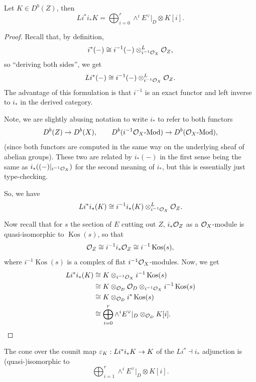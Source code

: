 \documentclass[12pt]{article}
\DeclareMathOperator{\Kos}{Kos}
\begin{document}
\begin{prop}\label{push-pull}
    Let $K\in D^b(Z)$, then
    \[Li^* i_* K = \bigoplus_{i=0}^r \wedge^i E^\vee|_D \otimes K [i].\]
\end{prop}
\begin{proof}
    Recall that, by definition,
    \[i^*(-) \cong i^{-1}(-) \otimes^L_{i^{-1}\mathcal{O}_X} \mathcal{O}_Z,\]
    so ``deriving both sides'', we get
    \[Li^*(-) \cong i^{-1}(-) \otimes^L_{i^{-1}\mathcal{O}_X} \mathcal{O}_Z.\]
    The advantage of this formulation is that $i^{-1}$ is an exact functor and left inverse to $i_*$ in the derived category.
    
    Note, we are slightly abusing notation to write $i_*$ to refer to both functors
    \[D^b(Z)\to D^b(X), \qquad D^b(i^{-1}\mathcal{O}_X\text{-}\mathrm{Mod}) \to D^b(\mathcal{O}_X\text{-}\mathrm{Mod}),\]
    (since both functors are computed in the same way on the underlying sheaf of abelian groups). These two are related by $i_*(-)$ in the first sense being the same as $i_*((-)|_{i^{-1}\mathcal{O}_X})$ for the second meaning of $i_*$, but this is essentially just type-checking.

    So, we have
    \[Li^*i_*(K) \cong i^{-1}i_*(K) \otimes_{i^{-1}\mathcal{O}_X}^L \mathcal{O}_Z.\]

    Now recall that for $s$ the section of $E$ cutting out $Z$, $i_*\mathcal{O}_Z$ as a $\mathcal{O}_X$-module is quasi-isomorphic to $\Kos(s)$, so that
    \[\cO_Z \cong i^{-1}i_*\cO_Z \cong i^{-1}\Kos(s),\]
    where $i^{-1}\Kos(s)$ is a complex of flat $i^{-1}\mathcal{O}_X$-modules. Now, we get
    \begin{align*}
        Li^*i_*(K) &\cong K \otimes_{i^{-1}\cO_X} i^{-1}\Kos(s)\\
        &\cong K \otimes_{\cO_D} \cO_D \otimes_{i^{-1}\cO_X} i^{-1}\Kos(s)\\
        &\cong K \otimes_{\cO_D} i^*\Kos(s)\\
        &\cong \bigoplus_{i=0}^r \wedge^i E^\vee|_D \otimes_{\cO_D} K[i].
    \end{align*}
\end{proof}

\begin{cor}\label{cone-of-counit}
    The cone over the counit map $\varepsilon_K: Li^* i_* K \to K$ of the $Li^* \dashv i_*$ adjunction is (quasi-)isomorphic to
    \[\bigoplus_{i=1}^r \wedge^i E^\vee|_D \otimes K[i].\]
\end{cor}
\end{document}
